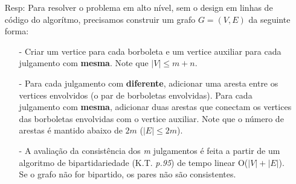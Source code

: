 \documentclass{homework}
\begin{document}
\pagestyle{fancy}

	\begin{enumerate}
		\item[Resp:] Para resolver o problema em alto nível, sem o design em linhas de código do algorítmo, precisamos construir um grafo $G = (V,E)$ da seguinte forma:
		\begin{itemize}
		    \item[-] Criar um vertice para cada borboleta e um vertice auxiliar para cada julgamento com \textbf{mesma}. Note que $|V| \leq m + n$.
		    \item[-] Para cada julgamento com \textbf{diferente}, adicionar uma aresta entre os vertices envolvidos (o par de borboletas envolvidas). Para cada julgamento com \textbf{mesma}, adicionar duas arestas que conectam os vertices das borboletas envolvidas com o vertice auxiliar. Note que o número de arestas é mantido abaixo de $2m$ ($|E| \leq 2m$).
		    \item[-] A avaliação da consistência dos \textit{m} julgamentos é feita a partir de um algoritmo de bipartidariedade (K.T. \textit{p.95}) de tempo linear O($|V|+|E|$). Se o grafo não for bipartido, os pares não são consistentes.
		\end{itemize}
	\end{enumerate}
\end{document}
